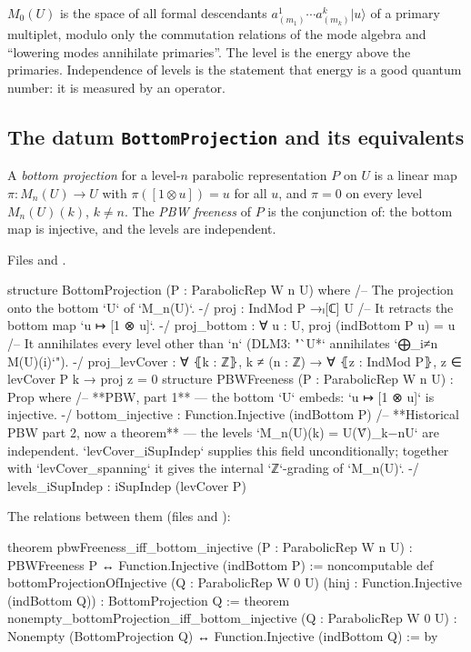 \begin{physics}
$M_0(U)$ is the space of all formal descendants $a^1_{(m_1)}\cdots a^k_{(m_k)}|u\rangle$ of a primary multiplet, modulo
only the commutation relations of the mode algebra and ``lowering modes annihilate primaries''. The level is the energy
above the primaries. Independence of levels is the statement that energy is a good quantum number: it is measured by an
operator.
\end{physics}

\subsection{The datum \texttt{BottomProjection} and its equivalents}

\begin{definition}\label{l13:def:bottomprojection}
A \emph{bottom projection} for a level-$n$ parabolic representation $P$ on $U$ is a linear map $\pi:M_n(U)\to U$ with
$\pi([1\otimes u]) = u$ for all $u$, and $\pi = 0$ on every level $M_n(U)(k)$, $k\neq n$. The \emph{PBW freeness} of $P$ is
the conjunction of: the bottom map is injective, and the levels are independent.
\end{definition}
\noindent Files  and
.
\begin{leancode}
structure BottomProjection (P : ParabolicRep W n U) where
  /-- The projection onto the bottom `U` of `M_n(U)`. -/
  proj : IndMod P →ₗ[ℂ] U
  /-- It retracts the bottom map `u ↦ [1 ⊗ u]`. -/
  proj_bottom : ∀ u : U, proj (indBottom P u) = u
  /-- It annihilates every level other than `n` (DLM3: "`U*` annihilates `⨁_{i≠n} M(U)(i)`"). -/
  proj_levCover : ∀ ⦃k : ℤ⦄, k ≠ (n : ℤ) → ∀ ⦃z : IndMod P⦄, z ∈ levCover P k → proj z = 0
structure PBWFreeness (P : ParabolicRep W n U) : Prop where
  /-- **PBW, part 1** — the bottom `U` embeds: `u ↦ [1 ⊗ u]` is injective. -/
  bottom_injective : Function.Injective (indBottom P)
  /-- **Historical PBW part 2, now a theorem** — the levels `M_n(U)(k) = U(V̂)_{k−n}U` are
  independent. `levCover_iSupIndep` supplies this field unconditionally; together with
  `levCover_spanning` it gives the internal `ℤ`-grading of `M_n(U)`. -/
  levels_iSupIndep : iSupIndep (levCover P)
\end{leancode}
\noindent The relations between them (files 
and ):
\begin{leancode}
theorem pbwFreeness_iff_bottom_injective (P : ParabolicRep W n U) :
    PBWFreeness P ↔ Function.Injective (indBottom P) :=
noncomputable def bottomProjectionOfInjective (Q : ParabolicRep W 0 U)
    (hinj : Function.Injective (indBottom Q)) : BottomProjection Q :=
theorem nonempty_bottomProjection_iff_bottom_injective (Q : ParabolicRep W 0 U) :
    Nonempty (BottomProjection Q) ↔ Function.Injective (indBottom Q) := by
\end{leancode}

